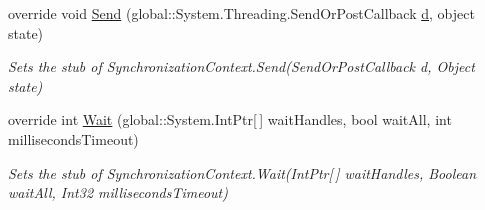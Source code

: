 \begin{DoxyCompactItemize}
override void \hyperlink{class_system_1_1_threading_1_1_fakes_1_1_stub_synchronization_context_afbc01f5cf187b5706a02c870c1c287e6}{Send} (global\-::\-System.\-Threading.\-Send\-Or\-Post\-Callback \hyperlink{bootstrap_8min_8js_aeb337d295abaddb5ec3cb34cc2e2bbc9}{d}, object state)
\begin{DoxyCompactList}\small\item\em Sets the stub of Synchronization\-Context.\-Send(\-Send\-Or\-Post\-Callback d, Object state)\end{DoxyCompactList}\item 
override int \hyperlink{class_system_1_1_threading_1_1_fakes_1_1_stub_synchronization_context_a88ad33631f3a29967a317ed7a864fe30}{Wait} (global\-::\-System.\-Int\-Ptr\mbox{[}$\,$\mbox{]} wait\-Handles, bool wait\-All, int milliseconds\-Timeout)
\begin{DoxyCompactList}\small\item\em Sets the stub of Synchronization\-Context.\-Wait(\-Int\-Ptr\mbox{[}$\,$\mbox{]} wait\-Handles, Boolean wait\-All, Int32 milliseconds\-Timeout)\end{DoxyCompactList}\end{DoxyCompactItemize}
